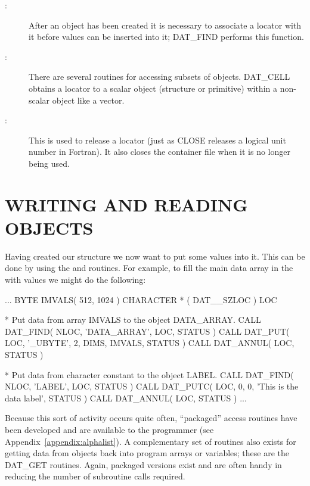 \documentclass[twoside,11pt]{starlink}
\providecommand{\qt}[1]{``#1''}
\begin{document}
\begin{description}
\item [:]
After an object has been created it is necessary to associate a
locator with it before values can be inserted into it; DAT\_FIND
performs this function.

\item [:]
There are several routines for accessing subsets of objects. DAT\_CELL
obtains a locator to a scalar object (structure or primitive) within a
non-scalar object like a vector.

\item [:]
This is used to release a locator (just as CLOSE releases a logical
unit number in Fortran). It also closes the container file when it is
no longer being used.

\end{description}

\section{WRITING AND READING OBJECTS}

Having created our structure we now want to put some values into
it. This can be done by using the  and
 routines. For example, to fill the main
data array in the  with
values we might do the following:

\begin{small}
\begin{terminalv}
      ...
      BYTE IMVALS( 512, 1024 )
      CHARACTER * ( DAT__SZLOC ) LOC

*  Put data from array IMVALS to the object DATA_ARRAY.
      CALL DAT_FIND( NLOC, 'DATA_ARRAY', LOC, STATUS )
      CALL DAT_PUT( LOC, '_UBYTE', 2, DIMS, IMVALS, STATUS )
      CALL DAT_ANNUL( LOC, STATUS )

*  Put data from character constant to the object LABEL.
      CALL DAT_FIND( NLOC, 'LABEL', LOC, STATUS )
      CALL DAT_PUTC( LOC, 0, 0, 'This is the data label', STATUS )
      CALL DAT_ANNUL( LOC, STATUS )
      ...
\end{terminalv}
\end{small}

Because this sort of activity occurs quite often, \qt{packaged} access
routines have been developed and are available to the programmer (see
Appendix~\ref{appendix:alphalist}).  A complementary set of routines
also exists for getting data from objects back into program arrays or
variables; these are the DAT\_GET routines. Again, packaged versions
exist and are often handy in reducing the number of subroutine calls
required.
\end{document}
